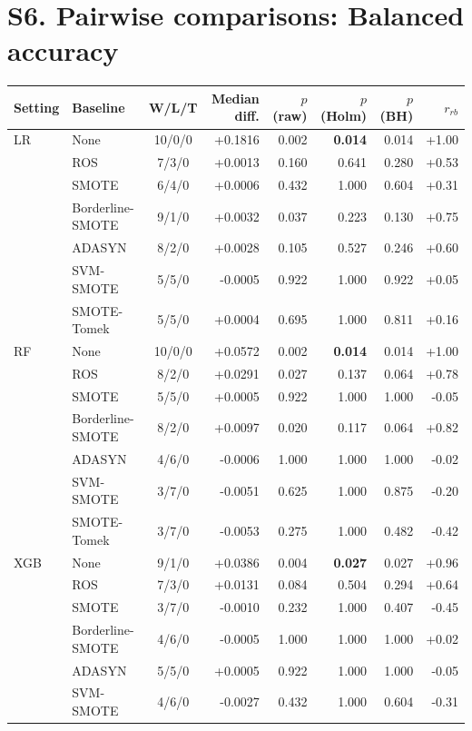 \documentclass[10pt,a4paper]{article}
\begin{document}
\section*{S6. Pairwise comparisons: Balanced accuracy}
\begin{center}\footnotesize\begin{longtable}{@{}llcrrrrr@{}}\toprule Setting & Baseline & W/L/T & Median diff. & $p$ (raw) & $p$ (Holm) & $p$ (BH) & $r_{rb}$ \\ \midrule\endhead
LR & None & 10/0/0 & +0.1816 & 0.002 & \textbf{0.014} & 0.014 & +1.00 \\
 & ROS & 7/3/0 & +0.0013 & 0.160 & 0.641 & 0.280 & +0.53 \\
 & SMOTE & 6/4/0 & +0.0006 & 0.432 & 1.000 & 0.604 & +0.31 \\
 & Borderline-SMOTE & 9/1/0 & +0.0032 & 0.037 & 0.223 & 0.130 & +0.75 \\
 & ADASYN & 8/2/0 & +0.0028 & 0.105 & 0.527 & 0.246 & +0.60 \\
 & SVM-SMOTE & 5/5/0 & -0.0005 & 0.922 & 1.000 & 0.922 & +0.05 \\
 & SMOTE-Tomek & 5/5/0 & +0.0004 & 0.695 & 1.000 & 0.811 & +0.16 \\
\midrule
RF & None & 10/0/0 & +0.0572 & 0.002 & \textbf{0.014} & 0.014 & +1.00 \\
 & ROS & 8/2/0 & +0.0291 & 0.027 & 0.137 & 0.064 & +0.78 \\
 & SMOTE & 5/5/0 & +0.0005 & 0.922 & 1.000 & 1.000 & -0.05 \\
 & Borderline-SMOTE & 8/2/0 & +0.0097 & 0.020 & 0.117 & 0.064 & +0.82 \\
 & ADASYN & 4/6/0 & -0.0006 & 1.000 & 1.000 & 1.000 & -0.02 \\
 & SVM-SMOTE & 3/7/0 & -0.0051 & 0.625 & 1.000 & 0.875 & -0.20 \\
 & SMOTE-Tomek & 3/7/0 & -0.0053 & 0.275 & 1.000 & 0.482 & -0.42 \\
\midrule
XGB & None & 9/1/0 & +0.0386 & 0.004 & \textbf{0.027} & 0.027 & +0.96 \\
 & ROS & 7/3/0 & +0.0131 & 0.084 & 0.504 & 0.294 & +0.64 \\
 & SMOTE & 3/7/0 & -0.0010 & 0.232 & 1.000 & 0.407 & -0.45 \\
 & Borderline-SMOTE & 4/6/0 & -0.0005 & 1.000 & 1.000 & 1.000 & +0.02 \\
 & ADASYN & 5/5/0 & +0.0005 & 0.922 & 1.000 & 1.000 & -0.05 \\
 & SVM-SMOTE & 4/6/0 & -0.0027 & 0.432 & 1.000 & 0.604 & -0.31 \\

\end{longtable}
\end{center}
\end{document}
